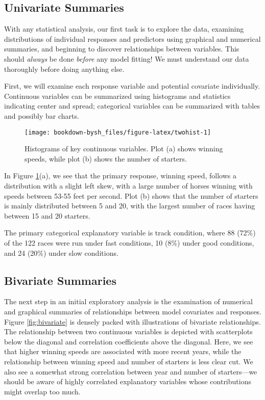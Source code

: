 \documentclass[
]{krantz}
\begin{document}
\hypertarget{univariate-summaries}{%
\subsection{Univariate Summaries}\label{univariate-summaries}}

With any statistical analysis, our first task is to explore the data, examining distributions of individual responses and predictors using graphical and numerical summaries, and beginning to discover relationships between variables. This should \emph{always} be done \emph{before} any model fitting! We must understand our data thoroughly before doing anything else.

First, we will examine each response variable and potential covariate individually. Continuous variables can be summarized using histograms and statistics indicating center and spread; categorical variables can be summarized with tables and possibly bar charts.

\begin{figure}

{\centering \texttt{[image: bookdown-bysh\_files/figure-latex/twohist-1]} 

}

\caption{Histograms of key continuous variables.  Plot (a) shows winning speeds, while plot (b) shows the number of starters.}\label{fig:twohist}
\end{figure}

In Figure \ref{fig:twohist}(a), we see that the primary response, winning speed, follows a distribution with a slight left skew, with a large number of horses winning with speeds between 53-55 feet per second. Plot (b) shows that the number of starters is mainly distributed between 5 and 20, with the largest number of races having between 15 and 20 starters.

The primary categorical explanatory variable is track condition, where 88 (72\%) of the 122 races were run under fast conditions, 10 (8\%) under good conditions, and 24 (20\%) under slow conditions.

\hypertarget{bivariate-summaries}{%
\subsection{Bivariate Summaries}\label{bivariate-summaries}}

The next step in an initial exploratory analysis is the examination of numerical and graphical summaries of relationships between model covariates and responses. Figure \ref{fig:bivariate} is densely packed with illustrations of bivariate relationships. The relationship between two continuous variables is depicted with scatterplots below the diagonal and correlation coefficients above the diagonal. Here, we see that higher winning speeds are associated with more recent years, while the relationship between winning speed and number of starters is less clear cut. We also see a somewhat strong correlation between year and number of starters---we should be aware of highly correlated explanatory variables whose contributions might overlap too much.
\end{document}
